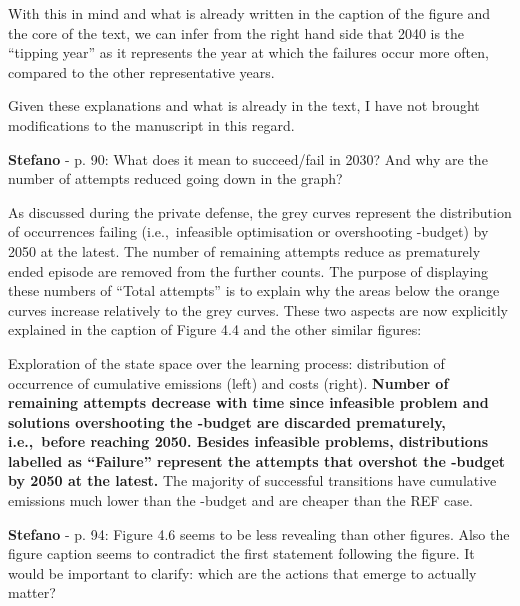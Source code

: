 \documentclass[12pt,a4paper]{article}
\def\ie{i.e.,\ }
\begin{document}
With this in mind and what is already written in the caption of the figure and the core of the text, we can infer from the right hand side that 2040 is the ``tipping year'' as it represents the year at which the failures occur more often, compared to the other representative years. 

Given these explanations and what is already in the text, I have not brought modifications to the manuscript in this regard.

\begin{mdframed}[style=comment] %
{\color{orange} \textbf{Stefano}} - p. 90: What does it mean to succeed/fail in 2030? And why are the number of attempts reduced going down in the graph?
\end{mdframed}

\noindent As discussed during the private defense, the grey curves represent the distribution of occurrences failing (\ie infeasible optimisation or overshooting -budget) by 2050 at the latest. The number of remaining attempts reduce as prematurely ended episode are removed from the further counts. The purpose of displaying these numbers of ``Total attempts'' is to explain why the areas below the orange curves increase relatively to the grey curves. These two aspects are now explicitly explained {\color{blue}in the caption of Figure 4.4 and the other similar figures}:

\begin{mdframed}[style=manuscript] %
Exploration of the state space over the learning process: distribution of occurrence of cumulative emissions (left) and costs (right). \textbf{Number of remaining attempts decrease with time since infeasible problem and solutions overshooting the -budget are discarded prematurely, \ie before reaching 2050. Besides infeasible problems, distributions labelled as ``Failure'' represent the attempts that overshot the -budget by 2050 at the latest.} The majority of successful transitions have cumulative emissions much lower than the -budget and are cheaper than the REF case. 
\end{mdframed}

\begin{mdframed}[style=comment] %
{\color{orange} \textbf{Stefano}} - p. 94: Figure 4.6 seems to be less revealing than other figures. Also the figure caption seems to contradict the first statement following the figure. It would be important to clarify: which are the actions that emerge to actually matter?
\end{mdframed}
\end{document}
